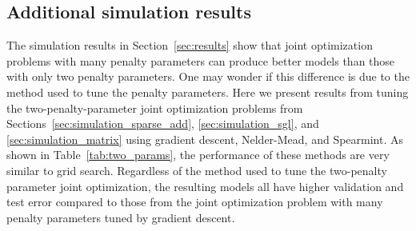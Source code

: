\documentclass[12pt,letterpaper]{article}
\begin{document}
\subsection{Additional simulation results}

The simulation results in Section~\ref{sec:results} show that joint optimization problems with many penalty parameters can produce better models than those with only two penalty parameters. One may wonder if this difference is due to the method used to tune the penalty parameters. Here we present results from tuning the two-penalty-parameter joint optimization problems from Sections~\ref{sec:simulation_sparse_add}, \ref{sec:simulation_sgl}, and \ref{sec:simulation_matrix} using gradient descent, Nelder-Mead, and Spearmint. As shown in Table~\ref{tab:two_params}, the performance of these methods are very similar to grid search. Regardless of the method used to tune the two-penalty parameter joint optimization, the resulting models all have higher validation and test error compared to those from the joint optimization problem with many penalty parameters tuned by gradient descent.
\end{document}
